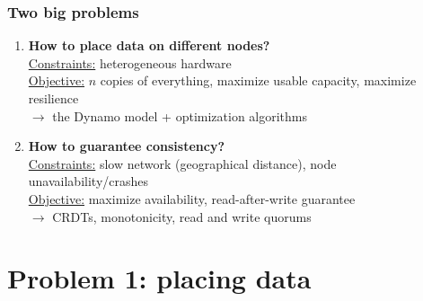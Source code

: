 \documentclass[aspectratio=169]{beamer}
\begin{document}
\begin{frame}
	\frametitle{Two big problems}
	\begin{enumerate}
		\item \textbf{How to place data on different nodes?}\\
			\vspace{1em}
			\underline{Constraints:} heterogeneous hardware\\
			\underline{Objective:} $n$ copies of everything, maximize usable capacity, maximize resilience\\
			\vspace{1em}
			$\to$ the Dynamo model + optimization algorithms
			\vspace{2em}
		\item<2-> \textbf{How to guarantee consistency?}\\
			\vspace{1em}
			\underline{Constraints:} slow network (geographical distance), node unavailability/crashes\\
			\underline{Objective:} maximize availability, read-after-write guarantee\\
			\vspace{1em}
			$\to$ CRDTs, monotonicity, read and write quorums
	\end{enumerate}
\end{frame}

\section{Problem 1: placing data}
\end{document}
